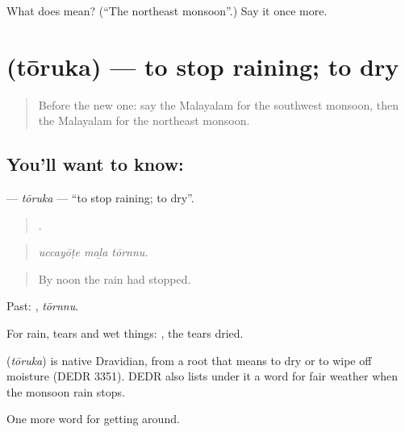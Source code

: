 \begin{tcolorbox}[breakable,colback=teal!4,colframe=teal!35!black,title={Before you move on}]
What does  mean? (\textquotedblleft{}The northeast monsoon\textquotedblright{}.) Say it once more.
\end{tcolorbox}
\section[\texorpdfstring{\ml{തോരുക} (tōruka)}{തോരുക (tōruka)}]{ (tōruka) — to stop raining; to dry}

\label{lesson:ML-C507-toruka}



\begin{quote}
Before the new one: say the Malayalam for the southwest monsoon, then the Malayalam for the northeast monsoon.
\end{quote}

\subsection*{You'll want to know: }
\textbf{} — \emph{tōruka} — \textquotedblleft{}to stop raining; to dry\textquotedblright{}.

\begin{quote}
  .
\end{quote}

\begin{quote}
\emph{uccayōṭe maḻa tōrnnu.}
\end{quote}

\begin{quote}
By noon the rain had stopped.
\end{quote}

Past: , \emph{tōrnnu}.

For rain, tears and wet things:  , the tears dried.

\begin{cousinweb}
\textbf{} (\emph{tōruka}) is native Dravidian, from a root that means to dry or to wipe off moisture (DEDR 3351). DEDR also lists under it a word for fair weather when the monsoon rain stops.
\end{cousinweb}

\begin{grammarlens}[title={What you've built}]
One more word for getting around.
\end{grammarlens}

